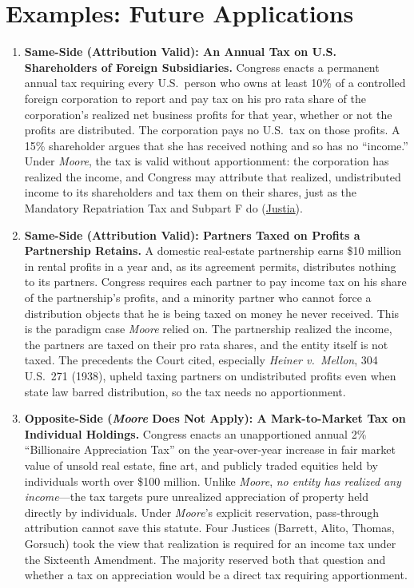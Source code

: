 \documentclass[12pt]{article}
\begin{document}
\section{Examples: Future Applications}
\begin{enumerate}

\item \textbf{Same-Side (Attribution Valid): An Annual Tax on U.S. Shareholders of Foreign Subsidiaries.} Congress enacts a permanent annual tax requiring every U.S.\ person who owns at least 10\% of a controlled foreign corporation to report and pay tax on his pro rata share of the corporation's realized net business profits for that year, whether or not the profits are distributed. The corporation pays no U.S.\ tax on those profits. A 15\% shareholder argues that she has received nothing and so has no ``income.'' Under \textit{Moore}, the tax is valid without apportionment: the corporation has realized the income, and Congress may attribute that realized, undistributed income to its shareholders and tax them on their shares, just as the Mandatory Repatriation Tax and Subpart F do (\href{https://supreme.justia.com/cases/federal/us/602/22-800/}{Justia}).

\item \textbf{Same-Side (Attribution Valid): Partners Taxed on Profits a Partnership Retains.} A domestic real-estate partnership earns \$10 million in rental profits in a year and, as its agreement permits, distributes nothing to its partners. Congress requires each partner to pay income tax on his share of the partnership's profits, and a minority partner who cannot force a distribution objects that he is being taxed on money he never received. This is the paradigm case \textit{Moore} relied on. The partnership realized the income, the partners are taxed on their pro rata shares, and the entity itself is not taxed. The precedents the Court cited, especially \textit{Heiner v.\ Mellon}, 304 U.S.\ 271 (1938), upheld taxing partners on undistributed profits even when state law barred distribution, so the tax needs no apportionment.

\item \textbf{Opposite-Side (\textit{Moore} Does Not Apply): A Mark-to-Market Tax on Individual Holdings.} Congress enacts an unapportioned annual 2\% ``Billionaire Appreciation Tax'' on the year-over-year increase in fair market value of unsold real estate, fine art, and publicly traded equities held by individuals worth over \$100 million. Unlike \textit{Moore}, \textit{no entity has realized any income}---the tax targets pure unrealized appreciation of property held directly by individuals. Under \textit{Moore}'s explicit reservation, pass-through attribution cannot save this statute. Four Justices (Barrett, Alito, Thomas, Gorsuch) took the view that realization is required for an income tax under the Sixteenth Amendment. The majority reserved both that question and whether a tax on appreciation would be a direct tax requiring apportionment.


\end{enumerate}
\end{document}
